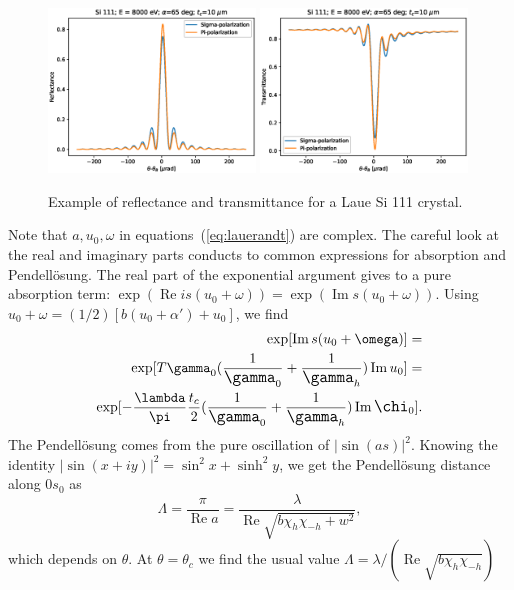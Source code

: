 \documentclass{iucr}
\newcommand{\inred}[1]{{\color{red}#1}}
\begin{document}
\begin{figure}\label{fig:laueProfiles}
    \centering
    \includegraphics[width=0.49\textwidth]{figures/Laue_1.eps}
    \includegraphics[width=0.49\textwidth]{figures/Laue_2.eps}
    \caption{Example of reflectance and transmittance for a Laue Si 111 crystal.}
\end{figure}

\inred{
Note that $a, u_0, \omega$ in equations~(\ref{eq:lauerandt}) are complex. The careful look at the real and imaginary parts conducts to common expressions for absorption and Pendell\"osung. The real part of the exponential argument gives to a pure absorption term:  
$\exp(\operatorname{Re} i s (u_0+\omega))
= \exp(\operatorname{Im} s (u_0 + \omega))$. Using $u_0 + \omega = (1/2)[b(u_0+\alpha')+u_0]$, we find
\begin{subequations}
\begin{align}
    \exp[\operatorname{Im} s (u_0+\omega)] = \nonumber\\
    \exp[T \gamma_0 \large( \frac{1}{\gamma_0} + \frac{1}{\gamma_h} \large) \operatorname{Im} u_0] = \nonumber \\
    \exp[-\frac{\lambda}{\pi} \frac{t_c}{2} \large( \frac{1}{\gamma_0} + \frac{1}{\gamma_h} \large) \operatorname{Im} \chi_0].
\end{align}
\end{subequations}
The Pendell\"osung comes from the pure oscillation of $|\sin(as)|^2$. Knowing the identity $|\sin(x+iy)|^2=\sin^2x + \sinh^2 y$, we get the Pendell\"osung distance along $0s_0$ as 
\begin{equation}
    \Lambda = \frac{\pi}{\operatorname{Re} a}=\frac{\lambda}{\operatorname{Re}\sqrt{b\chi_h\chi_{-h} + w^2}},
\end{equation}
which depends on $\theta$. At $\theta=\theta_c$ we find the usual value $\Lambda=\lambda/(\operatorname{Re}\sqrt{b \chi_h \chi_{-h}})$ 
}
\end{document}
